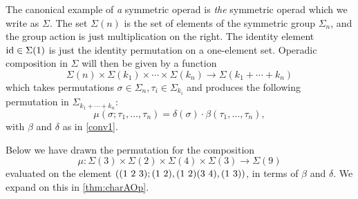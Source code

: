 \begin{example}\label{ex:Sigma}
The canonical example of \emph{a} symmetric operad is \emph{the} symmetric operad which we write as $\Sigma$. The set $\Sigma(n)$ is the set of elements of the symmetric group $\Sigma_{n}$, and the group action is just multiplication on the right. The identity element $\textrm{id} \in \Sigma(1)$ is just the identity permutation on a one-element set. Operadic composition in $\Sigma$ will then be given by a function
  \[
    \Sigma(n) \times \Sigma(k_{1}) \times \cdots \times \Sigma(k_{n}) \rightarrow \Sigma(k_{1} + \cdots + k_{n})
  \]
which takes permutations $\sigma \in \Sigma_{n}, \tau_{i} \in \Sigma_{k_{i}}$ and produces the following permutation in $\Sigma_{k_{1} + \cdots + k_{n}}$:
  \[
    \mu(\sigma; \tau_{1}, \ldots, \tau_{n}) = \delta(\sigma) \cdot \beta(\tau_1,\ldots,\tau_n),
  \]
with $\beta$ and $\delta$ as in \cref{conv1}.

Below we have drawn the permutation for the composition
  \[
    \mu \colon \Sigma(3) \times \Sigma(2) \times \Sigma(4) \times \Sigma(3) \rightarrow \Sigma(9)
  \]
evaluated on the element $\left( (1 \,\, 2 \,\, 3); ( 1 \, \, 2 ),( 1 \, \, 2 )( 3 \, \, 4 ),( 1 \, \, 3 ) \right)$, in terms of $\beta$ and $\delta$. We expand on this in \cref{thm:charAOp}.
  \begin{center}
  \end{center}
  

\end{example}
